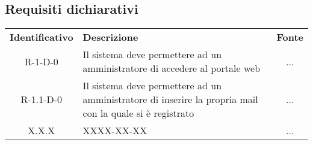 \subsection{Requisiti dichiarativi}
\renewcommand{\arraystretch}{1.5}
\begin{longtable}{ c C{9cm} c }
    \rowcolor{\primaryColor}
    \textcolor{\secondaryColor}{
    \textbf{Identificativo}} & \textcolor{\secondaryColor}{\textbf{Descrizione}}                                                            & \textcolor{\secondaryColor}
    {\textbf{Fonte}}                                                                                                                                                      \\

    R-1-D-0                  & Il sistema deve permettere ad un amministratore di accedere al portale web                                   & ...                         \\
    R-1.1-D-0                & Il sistema deve permettere ad un amministratore di inserire la propria mail con la quale si \`{e} registrato & ...                         \\
    X.X.X                    & XXXX-XX-XX                                                                                                   & ...                         \\
\end{longtable}
